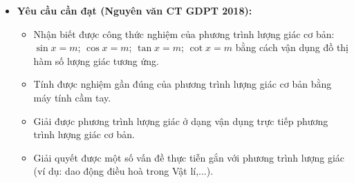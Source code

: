 \documentclass[12pt, a4paper]{article}
\begin{document}
\begin{itemize}[leftmargin=1.2cm]  
    \item \textbf{Yêu cầu cần đạt (Nguyên văn CT GDPT 2018):}  
    \begin{itemize}[leftmargin=0.6cm]  
        \item Nhận biết được công thức nghiệm của phương trình lượng giác cơ bản: $\sin x = m$; $\cos x = m$; $\tan x = m$; $\cot x = m$ bằng cách vận dụng đồ thị hàm số lượng giác tương ứng.  
        \item Tính được nghiệm gần đúng của phương trình lượng giác cơ bản bằng máy tính cầm tay.  
        \item Giải được phương trình lượng giác ở dạng vận dụng trực tiếp phương trình lượng giác cơ bản.  
        \item Giải quyết được một số vấn đề thực tiễn gắn với phương trình lượng giác (ví dụ: dao động điều hoà trong Vật lí,...).  
    \end{itemize}  
  

\end{itemize}
\end{document}
